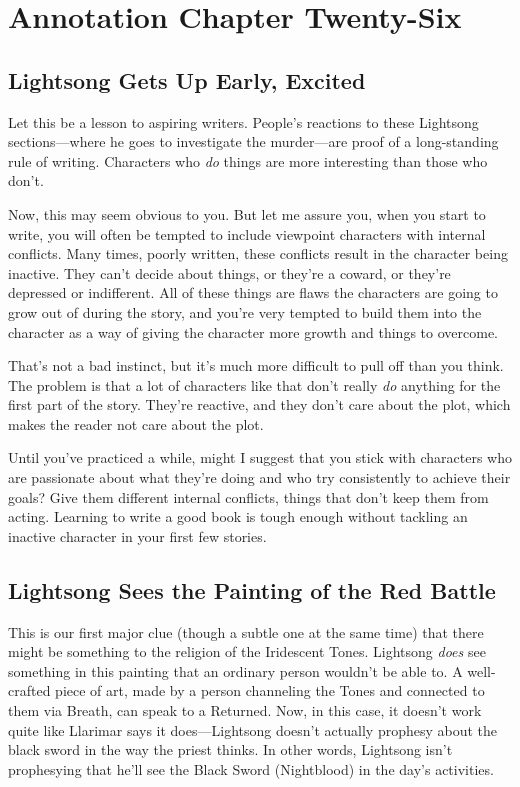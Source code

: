 \section{Annotation Chapter Twenty-Six}

\subsection*{Lightsong Gets Up Early, Excited}

Let this be a lesson to aspiring writers. People’s reactions to these Lightsong sections—where he goes to investigate the murder—are proof of a long-standing rule of writing. Characters who \textit{do} things are more interesting than those who don’t.

Now, this may seem obvious to you. But let me assure you, when you start to write, you will often be tempted to include viewpoint characters with internal conflicts. Many times, poorly written, these conflicts result in the character being inactive. They can’t decide about things, or they’re a coward, or they’re depressed or indifferent. All of these things are flaws the characters are going to grow out of during the story, and you’re very tempted to build them into the character as a way of giving the character more growth and things to overcome.

That’s not a bad instinct, but it’s much more difficult to pull off than you think. The problem is that a lot of characters like that don’t really \textit{do} anything for the first part of the story. They’re reactive, and they don’t care about the plot, which makes the reader not care about the plot.

Until you’ve practiced a while, might I suggest that you stick with characters who are passionate about what they’re doing and who try consistently to achieve their goals? Give them different internal conflicts, things that don’t keep them from acting. Learning to write a good book is tough enough without tackling an inactive character in your first few stories.

\subsection*{Lightsong Sees the Painting of the Red Battle}

This is our first major clue (though a subtle one at the same time) that there might be something to the religion of the Iridescent Tones. Lightsong \textit{does} see something in this painting that an ordinary person wouldn’t be able to. A well-crafted piece of art, made by a person channeling the Tones and connected to them via Breath, can speak to a Returned. Now, in this case, it doesn’t work quite like Llarimar says it does—Lightsong doesn’t actually prophesy about the black sword in the way the priest thinks. In other words, Lightsong isn’t prophesying that he’ll see the Black Sword (Nightblood) in the day’s activities.

